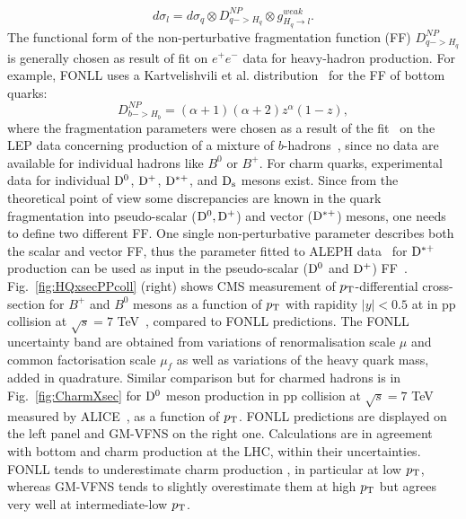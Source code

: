 \begin{equation}
d\sigma_l = d\sigma_{q} \otimes D^{NP}_{q->H_q} \otimes g^{weak}_{H_q \rightarrow l}.
\end{equation}
The functional form of the non-perturbative fragmentation function (FF) $D^{NP}_{q->H_q}$ 
is generally chosen as result of fit on $e^+e^-$ data for heavy-hadron production. For example, FONLL uses
a Kartvelishvili et al. distribution~\cite{Kartvelishvili:1977pi} for the FF of bottom quarks:
\begin{equation}
D^{NP}_{b->H_b}= (\alpha +1 )(\alpha +2)z^{\alpha} (1-z),
\end{equation}
where the fragmentation parameters were chosen as a result of the fit~\cite{Cacciari:2005uk} on the LEP data concerning production
of a mixture of $b$-hadrons~\cite{Heister:2001jg,Abbiendi:2002vt}, since no data are available for individual hadrons like $B^0$ or $B^+$.
For charm quarks, experimental data for individual ${\rm D^0}$, ${\rm D^+}$, ${\rm D^{*+}}$, and ${\rm D_s}$ mesons exist.
Since from the theoretical point of view some discrepancies are known in the quark fragmentation into 
pseudo-scalar (${\rm D^0}, {\rm D^+}$) and vector (${\rm D^{*+}}$) mesons, one needs to define two different FF. One single non-perturbative parameter
describes both the scalar and vector FF, thus the parameter fitted to ALEPH data~\cite{Barate:1999bg} for ${\rm D^{*+}}$ production can
be used as input in the pseudo-scalar (${\rm D^0}$ and ${\rm D^+}$) FF~\cite{Cacciari:2003zu}.
Fig.~\ref{fig:HQxsecPPcoll} (right) shows CMS measurement of $p_{\rm T}$-differential cross-section for $B^+$ and $B^0$ mesons
as a function of $p_{\rm T}$ with rapidity $|y| < 0.5$ at in pp collision at $\sqrt{s} = 7$ TeV~\cite{Khachatryan:2011mk,Chatrchyan:2011pw}, compared to FONLL predictions.
The FONLL uncertainty band are obtained from variations of renormalisation scale $\mu$ and common factorisation
scale $\mu_f$ as well as variations of the heavy quark mass, added in quadrature.
Similar comparison but for charmed hadrons is in Fig.~\ref{fig:CharmXsec} for ${\rm D^0}$ meson production
in pp collision at $\sqrt{s} = 7$ TeV measured by ALICE~\cite{Acharya:2017jgo}, as a function of $p_{\rm T}$. FONLL predictions are displayed on the left panel and GM-VFNS on the right one. Calculations are in agreement with bottom and charm production at the LHC, within their
uncertainties. FONLL tends to underestimate charm production , in particular at low $p_{\rm T}$, whereas GM-VFNS
tends to slightly overestimate them at high $p_{\rm T}$ but agrees very well at intermediate-low $p_{\rm T}$. \\



